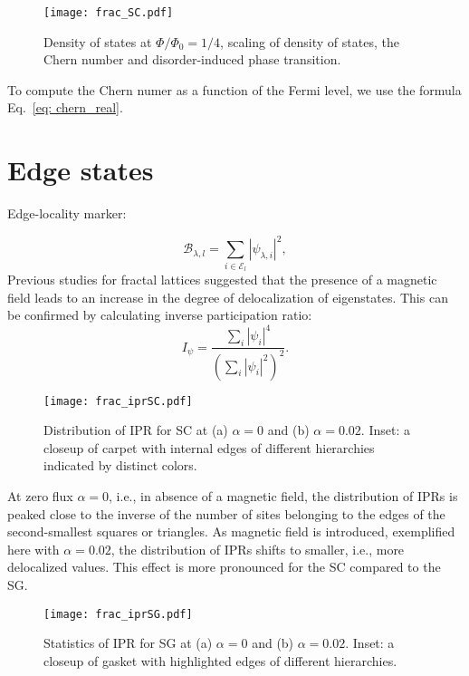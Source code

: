 \begin{figure}
\centering
\texttt{[image: frac\_SC.pdf]} 
\caption{Density of states at $\Phi / \Phi_0 = 1/4$, scaling of density of states, the Chern number and disorder-induced phase transition.}
\label{fig:flux_distr}
\end{figure}

To compute the Chern numer as a function of the Fermi level, we use the formula Eq.~\eqref{eq: chern_real}.


\section{Edge states}

Edge-locality marker:

\begin{equation}
\mathcal{B}_{\lambda, l} = \sum_{i \in \mathcal{E}_l} | \psi_{\lambda,i} |^2, 
\label{eq:edgemarker}
\end{equation}
Previous studies for fractal lattices \cite{supp1, supp2} suggested that the presence of a magnetic field leads to an increase in the degree of delocalization of eigenstates. This can be confirmed by calculating inverse participation ratio:
\begin{equation}
I_{\psi} = \frac{\sum_i | \psi_i |^4}{\left(\sum_i  |\psi_i |^2 \right)^2}.
\label{eq:ipr}
\end{equation}

\begin{figure}[h]
\centering
\texttt{[image: frac\_iprSC.pdf]}
\caption{Distribution of IPR for SC at (a) $\alpha = 0$ and (b) $\alpha = 0.02$. Inset: a closeup of carpet with internal edges of different hierarchies indicated by distinct colors.}
\label{fig:IPR_SC}
\end{figure}
At zero flux $\alpha = 0$, i.e., in absence of a magnetic field, the distribution of IPRs is peaked close to the inverse of the number of sites belonging to the edges of the second-smallest squares or triangles. As magnetic field is introduced, exemplified here with $\alpha = 0.02$, the distribution of IPRs shifts to smaller, i.e., more delocalized values. This effect is more pronounced for the SC compared to the SG.

\begin{figure}[h]
\centering
\texttt{[image: frac\_iprSG.pdf]}
\caption{Statistics of IPR for SG at (a) $\alpha = 0$ and (b) $\alpha = 0.02$. Inset: a closeup of gasket with highlighted edges of different hierarchies.}
\label{fig:IPR_SG}
\end{figure}


